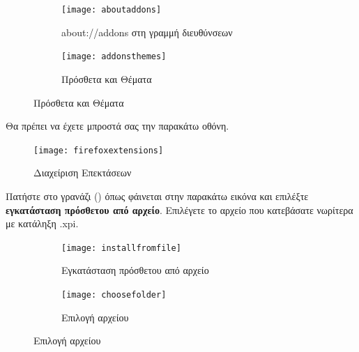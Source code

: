 \documentclass{article}
\begin{document}
\begin{figure}[H]
    \centering
    \begin{minipage}[t]{0.45\textwidth}
        \centering
        \begin{subfigure}[t]{\textwidth}
            \texttt{[image: aboutaddons]}
        \caption{about://addons στη γραμμή διευθύνσεων}
        \label{Fig:aboutaddons}
        \end{subfigure}
        \vspace{\fill}
    \end{minipage}
    \hfill
    \begin{minipage}{0.45\textwidth}
        \begin{subfigure}{\textwidth}
            \texttt{[image: addonsthemes]}
            \caption{Πρόσθετα και Θέματα}
            \label{Fig:addonsthemes}
        \end{subfigure}
    \end{minipage}
\end{figure}

Θα πρέπει να έχετε μπροστά σας την παρακάτω οθόνη.

\begin{figure}[H]
    \texttt{[image: firefoxextensions]}
    \caption*{Διαχείριση Επεκτάσεων}
\end{figure}

Πατήστε στο γρανάζι (\faCog) όπως φάινεται στην παρακάτω εικόνα και επιλέξτε \textbf{εγκατάσταση πρόσθετου από αρχείο}. Επιλέγετε το αρχείο που κατεβάσατε νωρίτερα με κατάληξη .xpi.

\begin{figure}[H]
    \centering
    \begin{minipage}[t]{0.45\textwidth}
        \centering
        \begin{subfigure}[t]{\textwidth}
            \texttt{[image: installfromfile]}
        \caption{Eγκατάσταση πρόσθετου από αρχείο}
        \label{Fig:installfromfile}
        \end{subfigure}
        \vspace{\fill}
    \end{minipage}
    \hfill
    \begin{minipage}{0.45\textwidth}
        \begin{subfigure}{\textwidth}
            \texttt{[image: choosefolder]}
            \caption{Επιλογή αρχείου}
            \label{Fig:choosefile}
        \end{subfigure}
    \end{minipage}
\end{figure}
\end{document}
